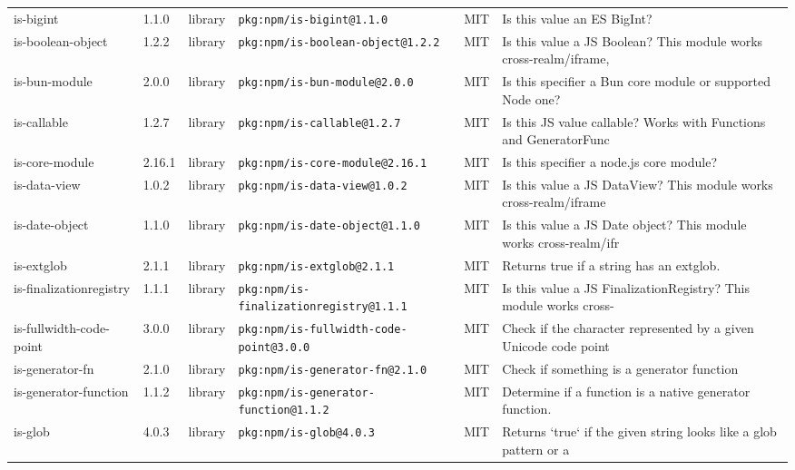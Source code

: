 \documentclass[11pt,a4paper]{article}
\begin{document}
\begin{longtable}{|p{4cm}|p{2cm}|p{1.6cm}|p{5cm}|p{1.5cm}|p{3.5cm}|}
\raggedright is-bigint & 1.1.0 & library & \small\texttt{pkg:npm/is-bigint@1.1.0} & MIT & \small Is this value an ES BigInt? \\
\raggedright is-boolean-object & 1.2.2 & library & \small\texttt{pkg:npm/is-boolean-object@1.2.2} & MIT & \small Is this value a JS Boolean? This module works cross-realm/iframe, \\
\raggedright is-bun-module & 2.0.0 & library & \small\texttt{pkg:npm/is-bun-module@2.0.0} & MIT & \small Is this specifier a Bun core module or supported Node one? \\
\raggedright is-callable & 1.2.7 & library & \small\texttt{pkg:npm/is-callable@1.2.7} & MIT & \small Is this JS value callable? Works with Functions and GeneratorFunc \\
\raggedright is-core-module & 2.16.1 & library & \small\texttt{pkg:npm/is-core-module@2.16.1} & MIT & \small Is this specifier a node.js core module? \\
\raggedright is-data-view & 1.0.2 & library & \small\texttt{pkg:npm/is-data-view@1.0.2} & MIT & \small Is this value a JS DataView? This module works cross-realm/iframe \\
\raggedright is-date-object & 1.1.0 & library & \small\texttt{pkg:npm/is-date-object@1.1.0} & MIT & \small Is this value a JS Date object? This module works cross-realm/ifr \\
\raggedright is-extglob & 2.1.1 & library & \small\texttt{pkg:npm/is-extglob@2.1.1} & MIT & \small Returns true if a string has an extglob. \\
\raggedright is-finalizationregistry & 1.1.1 & library & \small\texttt{pkg:npm/is-finalizationregistry@1.1.1} & MIT & \small Is this value a JS FinalizationRegistry? This module works cross- \\
\raggedright is-fullwidth-code-point & 3.0.0 & library & \small\texttt{pkg:npm/is-fullwidth-code-point@3.0.0} & MIT & \small Check if the character represented by a given Unicode code point  \\
\raggedright is-generator-fn & 2.1.0 & library & \small\texttt{pkg:npm/is-generator-fn@2.1.0} & MIT & \small Check if something is a generator function \\
\raggedright is-generator-function & 1.1.2 & library & \small\texttt{pkg:npm/is-generator-function@1.1.2} & MIT & \small Determine if a function is a native generator function. \\
\raggedright is-glob & 4.0.3 & library & \small\texttt{pkg:npm/is-glob@4.0.3} & MIT & \small Returns `true` if the given string looks like a glob pattern or a \\

\end{longtable}
\end{document}
